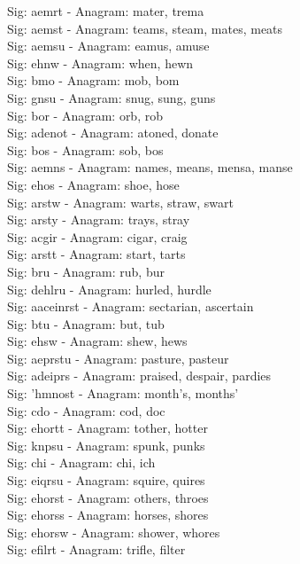 Sig: {aemrt} - Anagram: mater, trema \\
Sig: {aemst} - Anagram: teams, steam, mates, meats \\
Sig: {aemsu} - Anagram: eamus, amuse \\
Sig: {ehnw} - Anagram: when, hewn \\
Sig: {bmo} - Anagram: mob, bom \\
Sig: {gnsu} - Anagram: snug, sung, guns \\
Sig: {bor} - Anagram: orb, rob \\
Sig: {adenot} - Anagram: atoned, donate \\
Sig: {bos} - Anagram: sob, bos \\
Sig: {aemns} - Anagram: names, means, mensa, manse \\
Sig: {ehos} - Anagram: shoe, hose \\
Sig: {arstw} - Anagram: warts, straw, swart \\
Sig: {arsty} - Anagram: trays, stray \\
Sig: {acgir} - Anagram: cigar, craig \\
Sig: {arstt} - Anagram: start, tarts \\
Sig: {bru} - Anagram: rub, bur \\
Sig: {dehlru} - Anagram: hurled, hurdle \\
Sig: {aaceinrst} - Anagram: sectarian, ascertain \\
Sig: {btu} - Anagram: but, tub \\
Sig: {ehsw} - Anagram: shew, hews \\
Sig: {aeprstu} - Anagram: pasture, pasteur \\
Sig: {adeiprs} - Anagram: praised, despair, pardies \\
Sig: {'hmnost} - Anagram: month's, months' \\
Sig: {cdo} - Anagram: cod, doc \\
Sig: {ehortt} - Anagram: tother, hotter \\
Sig: {knpsu} - Anagram: spunk, punks \\
Sig: {chi} - Anagram: chi, ich \\
Sig: {eiqrsu} - Anagram: squire, quires \\
Sig: {ehorst} - Anagram: others, throes \\
Sig: {ehorss} - Anagram: horses, shores \\
Sig: {ehorsw} - Anagram: shower, whores \\
Sig: {efilrt} - Anagram: trifle, filter \\
